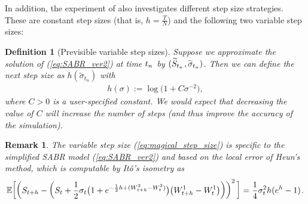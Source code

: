 \documentclass[sn-mathphys-num]{sn-jnl}%
\newtheorem{remark}{Remark}%
\newtheorem{definition}{Definition}%
\newcommand{\E}{\mathbb{E}}
\newcommand{\m}{\hspace{0.25mm}}
\begin{document}
In addition, the experiment of \cite{foster2024adaptive} also investigates different step size strategies. These are constant step sizes (that is, $h = \frac{T}{N}$) and the following two variable step sizes:\medbreak

\begin{definition}[Previsible variable step sizes]
Suppose we approximate the solution of (\ref{eq:SABR_ver2}) at time $t_n\m$ by $(\widetilde{S}_{t_n}\m, \widetilde{\sigma}_{t_n})$. Then we can define the next step size as $h(\widetilde{\sigma}_{t_n})$ with
\begin{align}\label{eq:magical_step_size}
h(\sigma) := \log\big(1 + C\sigma^{-2}\big),
\end{align}
where $C > 0$ is a user-specified constant. We would expect that decreasing the value of $C$ will increase the number of steps (and thus improve the accuracy of the simulation).
\end{definition}\medbreak
\begin{remark}
The variable step size (\ref{eq:magical_step_size}) is specific to the simplified SABR model (\ref{eq:SABR_ver2}) and based on the local error of Heun's method, which is computable by It\^{o}'s isometry as
\begin{align*}
\E\bigg[\bigg(S_{t+h} - \bigg(S_t+\frac{1}{2}\sigma_t\big(1 + e^{-\frac{1}{2}h + (W_{t+h}^2-W_t^2)}\big)\big(W_{t+h}^1 - W_t^1\big)\bigg)\bigg)^2\,\bigg] = \frac{1}{4}\sigma_t^2 h (e^h - 1)\m.
\end{align*} 
\end{remark}\medbreak
\end{document}
